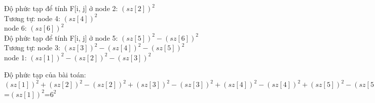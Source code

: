 \documentclass[10pt,a4paper]{article}
\begin{document}
\begin{flushleft}
Độ phức tạp để tính F[i, j] ở node 2: $(sz[2])^2$\\
Tương tự: \hspace{3.7 cm}node 4: $(sz[4])^2$\\
\hspace{6 cm}node 6: $(sz[6])^2$\\
Độ phức tạp để tính F[i, j] ở node 5: $(sz[5])^2-(sz[6])^2$\\
Tương tự: \hspace{3.7 cm}node 3: $(sz[3])^2-(sz[4])^2-(sz[5])^2$\\
\hspace{6 cm}node 1: $(sz[1])^2-(sz[2])^2-(sz[3])^2$\\
\end{flushleft}

Độ phức tạp của bài toán: $(sz[1])^2+(sz[2])^2-(sz[2])^2+(sz[3])^2-(sz[3])^2+(sz[4])^2-(sz[4])^2+(sz[5])^2-(sz[5])^2+(sz[6])^2-(sz[6])^2$=$(sz[1])^2$=$6^2$
\end{document}
